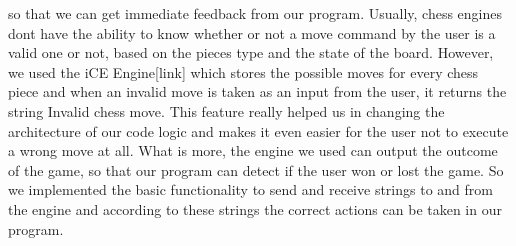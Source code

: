 so that we can get immediate feedback from our program. Usually, chess engines dont have the ability to know whether or not a move command by the user is a valid one or not, based on the pieces type and the state of the board. However, we used the iCE Engine[link] which stores the possible moves for every chess piece and when an invalid move is taken as an input from the user, it returns the string Invalid chess move. This feature really helped us in changing the architecture of our code logic and makes it even easier for the user not to execute a wrong move at all. What is more, the engine we used can output the outcome of the game, so that our program can detect if the user won or lost the game. So we implemented the basic functionality to send and receive strings to and from the engine and according to these strings the correct actions can be taken in our program.










 
